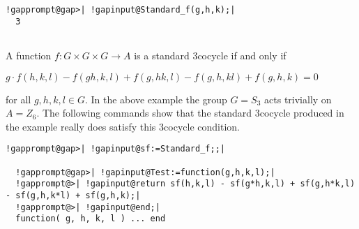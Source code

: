 \documentclass[a4paper,11pt]{report}
\begin{document}
{{\begin{Verbatim}[commandchars=!@|,fontsize=\small,frame=single,label=Example]
  !gapprompt@gap>| !gapinput@Standard_f(g,h,k);|
  3
  
\end{Verbatim}
 A function $f\colon G\times G\times G \rightarrow A$ is a standard $3$\texttt{}cocycle if and only if 

$g\cdot f(h,k,l) - f(gh,k,l) + f(g,hk,l) - f(g,h,kl) + f(g,h,k) = 0$ 

for all $g,h,k,l \in G$. In the above example the group $G=S_3$ acts trivially on $A=Z_6$. The following commands show that the standard $3$\texttt{}cocycle produced in the example really does satisfy this $3$\texttt{}cocycle condition. 
\begin{Verbatim}[commandchars=!@|,fontsize=\small,frame=single,label=Example]
  !gapprompt@gap>| !gapinput@sf:=Standard_f;;|
  
  !gapprompt@gap>| !gapinput@Test:=function(g,h,k,l);|
  !gapprompt@>| !gapinput@return sf(h,k,l) - sf(g*h,k,l) + sf(g,h*k,l) - sf(g,h,k*l) + sf(g,h,k);|
  !gapprompt@>| !gapinput@end;|
  function( g, h, k, l ) ... end
  

\end{Verbatim}}}
\end{document}
